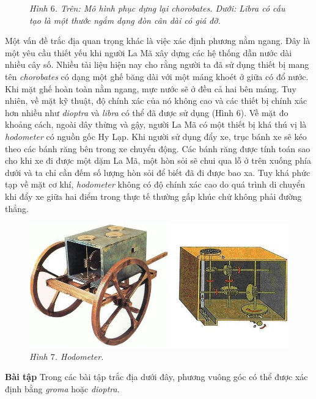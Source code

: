 \begin{multicols}{2}
\begin{figure}[H]
		\caption{\small\textit{\color{toanhocdoisong}Hình $6$. Trên: Mô hình phục dựng lại chorobates. Dưới: Libra có cấu tạo là một thước ngắm dạng đòn cân dài có giá đỡ.}}
		\vspace*{-10pt}
	\end{figure}
	Một vấn đề trắc địa quan trọng khác là việc xác định phương nằm ngang. Đây là một yêu cầu thiết yếu khi người La Mã xây dựng các hệ thống dẫn nước dài nhiều cây số. Nhiều tài liệu hiện nay cho rằng người ta đã sử dụng thiết bị mang tên \textit{chorobates} có dạng một ghế băng dài với một máng khoét ở giữa có đổ nước. Khi mặt ghế hoàn toàn nằm ngang, mực nước sẽ ở đều cả hai bên máng. Tuy nhiên, về mặt kỹ thuật, độ chính xác của nó không cao và các thiết bị chính xác hơn nhiều như \textit{dioptra} và \textit{libra} có thể đã được sử dụng (Hình $6$). 
	\vskip 0.1cm
	Về mặt đo khoảng cách, ngoài dây thừng và gậy, người La Mã có một thiết bị khá thú vị là \textit{hodometer} có nguồn gốc Hy Lạp. Khi người sử dụng đẩy xe, trục bánh xe sẽ kéo theo các bánh răng bên trong xe chuyển động. Các bánh răng được tính toán sao cho khi xe đi được một dặm La Mã, một hòn sỏi sẽ chui qua lỗ ở trên xuống phía dưới và ta chỉ cần đếm số lượng hòn sỏi để biết đã đi được bao xa. Tuy khá phức tạp về mặt cơ khí, \textit{hodometer} không có độ chính xác cao do quá trình di chuyển khi đẩy xe giữa hai điểm trong thực tế thường gấp khúc chứ không phải đường thẳng.
	\begin{figure}[H]
		\vspace*{-5pt}
		\centering
		\captionsetup{labelformat= empty, justification=centering}
		\includegraphics[width= 1\linewidth]{7}
		\caption{\small\textit{\color{toanhocdoisong}Hình $7$. Hodometer.}}
		\vspace*{-10pt}
	\end{figure}
	\textbf{\color{toanhocdoisong}Bài tập}
	\vskip 0.1cm
	Trong các bài tập trắc địa dưới đây, phương vuông góc có thể được xác định bằng \textit{groma} hoặc \textit{dioptra}.

\end{multicols}
